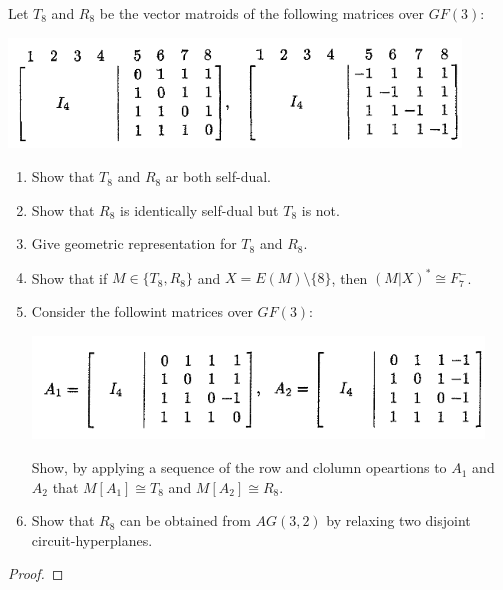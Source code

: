 \prob
{
    Let $T_8$ and $R_8$ be the vector matroids of the following matrices over $GF(3)$:\pn
            \begin{center}
                \includegraphics[width=12cm]{Test2/Problem7/FirstMatrices.png}
            \end{center}\pn
    
    \begin{enumerate}[label=(\roman*)]
        \item Show that $T_8$ and $R_8$ ar both self-dual.
        \item Show that $R_8$ is identically self-dual but $T_8$ is not.
        \item Give geometric representation for $T_8$ and $R_8$.
        \item Show that if $M \in \{T_8, R_8\}$ and $X = E(M) \setminus \{8\}$, then
                $(M|X)^* \cong F_7^-$.
        \item Consider the followint matrices over $GF(3)$:
            \begin{center}
                \includegraphics[width=12cm]{Test2/Problem7/SecondMatrices.png}
            \end{center}\pn
            Show, by applying a sequence of the row and clolumn opeartions to $A_1$ and $A_2$
            that $M[A_1] \cong T_8$ and $M[A_2] \cong R_8$.
        \item Show that $R_8$ can be obtained from $AG(3, 2)$ by relaxing two disjoint 
            circuit-hyperplanes.
    \end{enumerate}
}
\begin{proof}
\end{proof}
